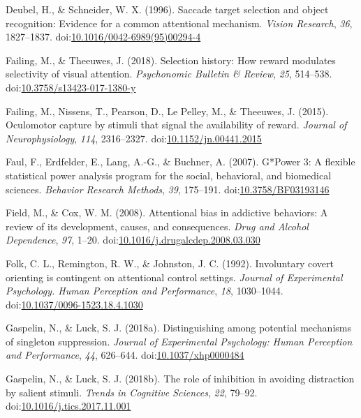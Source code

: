\documentclass[jou, a4paper, noextraspace,floatsintext]{apa6}
\theoremstyle{definition}
\theoremstyle{definition}
\theoremstyle{definition}
\theoremstyle{remark}
\begin{document}
\hypertarget{ref-Deubel1996}{}
Deubel, H., \& Schneider, W. X. (1996). Saccade target selection and
object recognition: Evidence for a common attentional mechanism.
\emph{Vision Research}, \emph{36}, 1827--1837.
doi:\href{https://doi.org/10.1016/0042-6989(95)00294-4}{10.1016/0042-6989(95)00294-4}

\hypertarget{ref-Failing2018}{}
Failing, M., \& Theeuwes, J. (2018). Selection history: How reward
modulates selectivity of visual attention. \emph{Psychonomic Bulletin \&
Review}, \emph{25}, 514--538.
doi:\href{https://doi.org/10.3758/s13423-017-1380-y}{10.3758/s13423-017-1380-y}

\hypertarget{ref-Failing2015}{}
Failing, M., Nissens, T., Pearson, D., Le Pelley, M., \& Theeuwes, J.
(2015). Oculomotor capture by stimuli that signal the availability of
reward. \emph{Journal of Neurophysiology}, \emph{114}, 2316--2327.
doi:\href{https://doi.org/10.1152/jn.00441.2015}{10.1152/jn.00441.2015}

\hypertarget{ref-Faul2007}{}
Faul, F., Erdfelder, E., Lang, A.-G., \& Buchner, A. (2007). G*Power 3:
A flexible statistical power analysis program for the social,
behavioral, and biomedical sciences. \emph{Behavior Research Methods},
\emph{39}, 175--191.
doi:\href{https://doi.org/10.3758/BF03193146}{10.3758/BF03193146}

\hypertarget{ref-Field2008}{}
Field, M., \& Cox, W. M. (2008). Attentional bias in addictive
behaviors: A review of its development, causes, and consequences.
\emph{Drug and Alcohol Dependence}, \emph{97}, 1--20.
doi:\href{https://doi.org/10.1016/j.drugalcdep.2008.03.030}{10.1016/j.drugalcdep.2008.03.030}

\hypertarget{ref-Folk1992}{}
Folk, C. L., Remington, R. W., \& Johnston, J. C. (1992). Involuntary
covert orienting is contingent on attentional control settings.
\emph{Journal of Experimental Psychology. Human Perception and
Performance}, \emph{18}, 1030--1044.
doi:\href{https://doi.org/10.1037/0096-1523.18.4.1030}{10.1037/0096-1523.18.4.1030}

\hypertarget{ref-Gaspelin2018b}{}
Gaspelin, N., \& Luck, S. J. (2018a). Distinguishing among potential
mechanisms of singleton suppression. \emph{Journal of Experimental
Psychology: Human Perception and Performance}, \emph{44}, 626--644.
doi:\href{https://doi.org/10.1037/xhp0000484}{10.1037/xhp0000484}

\hypertarget{ref-Gaspelin2018}{}
Gaspelin, N., \& Luck, S. J. (2018b). The role of inhibition in avoiding
distraction by salient stimuli. \emph{Trends in Cognitive Sciences},
\emph{22}, 79--92.
doi:\href{https://doi.org/10.1016/j.tics.2017.11.001}{10.1016/j.tics.2017.11.001}
\end{document}
